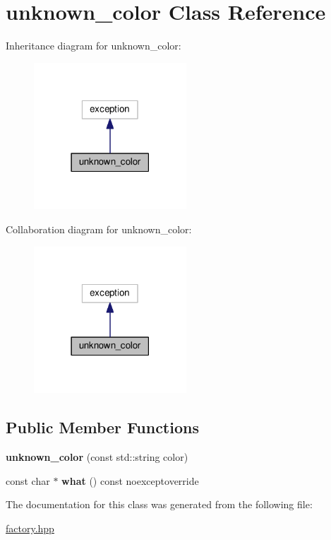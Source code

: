 \hypertarget{classunknown__color}{}\section{unknown\+\_\+color Class Reference}
\label{classunknown__color}


Inheritance diagram for unknown\+\_\+color\+:\nopagebreak
\begin{figure}[H]
\begin{center}
\leavevmode
\includegraphics[width=162pt]{classunknown__color__inherit__graph}
\end{center}
\end{figure}


Collaboration diagram for unknown\+\_\+color\+:\nopagebreak
\begin{figure}[H]
\begin{center}
\leavevmode
\includegraphics[width=162pt]{classunknown__color__coll__graph}
\end{center}
\end{figure}
\subsection*{Public Member Functions}
\begin{DoxyCompactItemize}
\item 
{\bfseries unknown\+\_\+color} (const std\+::string color)\hypertarget{classunknown__color_aef7c5513b511dd59ba1a3a58798966d3}{}\label{classunknown__color_aef7c5513b511dd59ba1a3a58798966d3}

\item 
const char $\ast$ {\bfseries what} () const noexceptoverride\hypertarget{classunknown__color_a4018a6f68c69a4c9231fa368dc757563}{}\label{classunknown__color_a4018a6f68c69a4c9231fa368dc757563}

\end{DoxyCompactItemize}


The documentation for this class was generated from the following file\+:\begin{DoxyCompactItemize}
\item 
\hyperlink{factory_8hpp}{factory.\+hpp}\end{DoxyCompactItemize}
